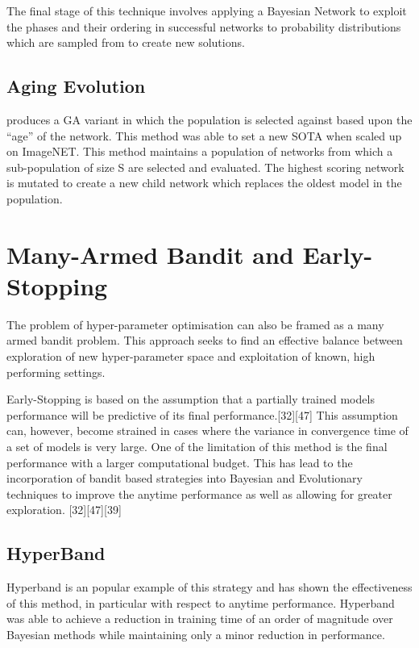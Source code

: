\documentclass{article}
\begin{document}
The final stage of this technique involves applying a Bayesian Network to exploit the phases and their ordering in successful networks to probability distributions which are sampled from to create new solutions.

\subsection{Aging Evolution}
\cite{42} produces a GA variant in which the population is selected against based upon the “age” of the network. This method was able to set a new SOTA when scaled up on ImageNET.
This method maintains a population of networks from which a sub-population of size S are selected and evaluated. The highest scoring network is mutated to create a new child network which replaces the oldest model in the population.  


\section {Many-Armed Bandit and Early-Stopping}

The problem of hyper-parameter optimisation can also be framed as a many armed bandit problem. This approach seeks to find an effective balance between exploration of new hyper-parameter space and exploitation of known, high performing settings.
\par
Early-Stopping is based on the assumption that a partially trained models performance will be predictive of its final performance.[32][47] This assumption can, however, become strained in cases where the variance in convergence time of a set of models is very large. One of the limitation of this method is the final performance with a larger computational budget. This has lead to the incorporation of bandit based strategies into Bayesian and Evolutionary techniques to improve the anytime performance as well as allowing for greater exploration. [32][47][39]

\subsection{HyperBand}

Hyperband \cite{48} is an popular example of this strategy and has shown the effectiveness of this method, in particular with respect to anytime performance. Hyperband was able to achieve a reduction in training time of an order of magnitude over Bayesian methods while maintaining only a minor reduction in performance.
\end{document}
